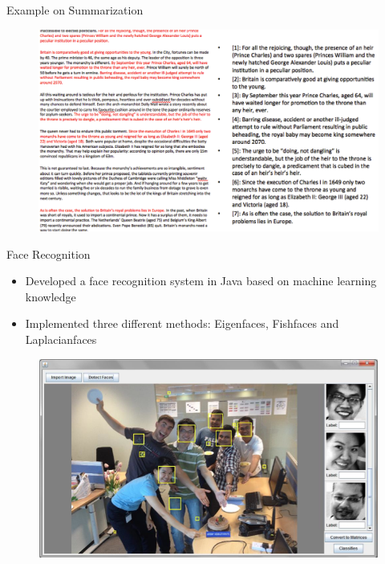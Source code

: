 \documentclass{beamer}
\begin{document}
\begin{frame}{Example on Summarization}
           \begin{figure}[!ht]
            \centering
                    \includegraphics[scale=0.5]{./summarization.png}
            \end{figure}
\end{frame}

\begin{frame}{Face Recognition}
	\begin{itemize}
		\item {Developed a face recognition system in Java based on machine learning knowledge}
		\item {Implemented three different methods: \alert{Eigenfaces, Fishfaces and Laplacianfaces}}
	\end{itemize}
	
	\begin{figure}[!ht]
     	\centering
        	\includegraphics[scale=0.4]{./face.png}
    \end{figure}
\end{frame}
\end{document}
